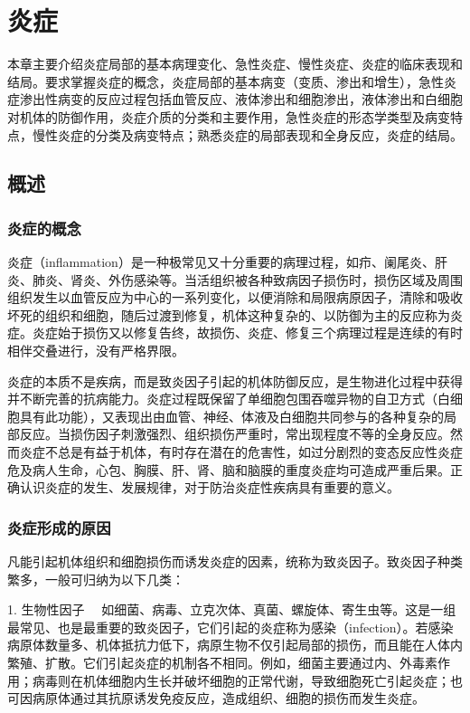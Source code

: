 \chapter{炎症}

本章主要介绍炎症局部的基本病理变化、急性炎症、慢性炎症、炎症的临床表现和结局。要求掌握炎症的概念，炎症局部的基本病变（变质、渗出和增生），急性炎症渗出性病变的反应过程包括血管反应、液体渗出和细胞渗出，液体渗出和白细胞对机体的防御作用，炎症介质的分类和主要作用，急性炎症的形态学类型及病变特点，慢性炎症的分类及病变特点；熟悉炎症的局部表现和全身反应，炎症的结局。

\section{概述}

\subsection{炎症的概念}

炎症（inflammation）是一种极常见又十分重要的病理过程，如疖、阑尾炎、肝炎、肺炎、肾炎、外伤感染等。当活组织被各种致病因子损伤时，损伤区域及周围组织发生以血管反应为中心的一系列变化，以便消除和局限病原因子，清除和吸收坏死的组织和细胞，随后过渡到修复，机体这种复杂的、以防御为主的反应称为炎症。炎症始于损伤又以修复告终，故损伤、炎症、修复三个病理过程是连续的有时相伴交叠进行，没有严格界限。

炎症的本质不是疾病，而是致炎因子引起的机体防御反应，是生物进化过程中获得并不断完善的抗病能力。炎症过程既保留了单细胞包围吞噬异物的自卫方式（白细胞具有此功能），又表现出由血管、神经、体液及白细胞共同参与的各种复杂的局部反应。当损伤因子刺激强烈、组织损伤严重时，常出现程度不等的全身反应。然而炎症不总是有益于机体，有时存在潜在的危害性，如过分剧烈的变态反应性炎症危及病人生命，心包、胸膜、肝、肾、脑和脑膜的重度炎症均可造成严重后果。正确认识炎症的发生、发展规律，对于防治炎症性疾病具有重要的意义。

\subsection{炎症形成的原因}

凡能引起机体组织和细胞损伤而诱发炎症的因素，统称为致炎因子。致炎因子种类繁多，一般可归纳为以下几类：

{1. 生物性因子}
　如细菌、病毒、立克次体、真菌、螺旋体、寄生虫等。这是一组最常见、也是最重要的致炎因子，它们引起的炎症称为感染（infection）。若感染病原体数量多、机体抵抗力低下，病原生物不仅引起局部的损伤，而且能在人体内繁殖、扩散。它们引起炎症的机制各不相同。例如，细菌主要通过内、外毒素作用；病毒则在机体细胞内生长并破坏细胞的正常代谢，导致细胞死亡引起炎症；也可因病原体通过其抗原诱发免疫反应，造成组织、细胞的损伤而发生炎症。

